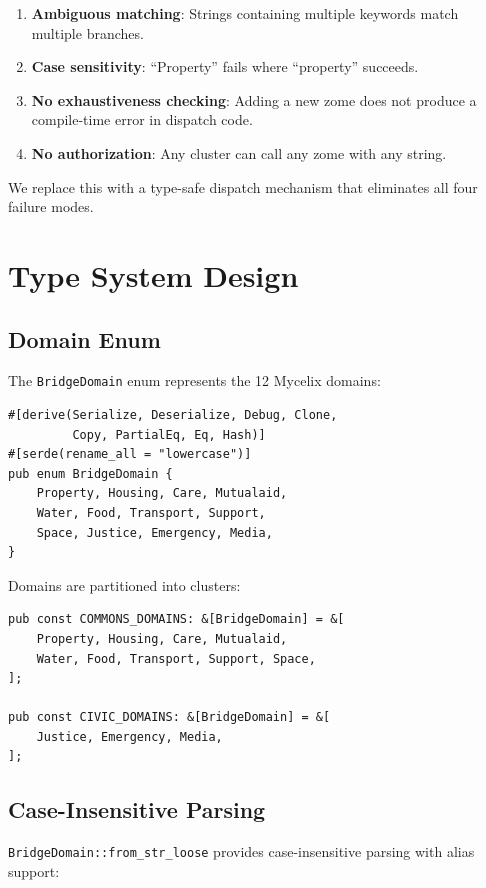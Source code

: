 \documentclass[11pt,twocolumn]{article}
\begin{document}
\begin{enumerate}[nosep]
  \item \textbf{Ambiguous matching}: Strings containing multiple keywords
    match multiple branches.
  \item \textbf{Case sensitivity}: ``Property'' fails where ``property'' succeeds.
  \item \textbf{No exhaustiveness checking}: Adding a new zome does not produce
    a compile-time error in dispatch code.
  \item \textbf{No authorization}: Any cluster can call any zome with any string.
\end{enumerate}

We replace this with a type-safe dispatch mechanism that eliminates all four
failure modes.

\section{Type System Design}

\subsection{Domain Enum}

The \texttt{BridgeDomain} enum represents the 12 Mycelix domains:

\begin{lstlisting}
#[derive(Serialize, Deserialize, Debug, Clone,
         Copy, PartialEq, Eq, Hash)]
#[serde(rename_all = "lowercase")]
pub enum BridgeDomain {
    Property, Housing, Care, Mutualaid,
    Water, Food, Transport, Support,
    Space, Justice, Emergency, Media,
}
\end{lstlisting}

Domains are partitioned into clusters:

\begin{lstlisting}
pub const COMMONS_DOMAINS: &[BridgeDomain] = &[
    Property, Housing, Care, Mutualaid,
    Water, Food, Transport, Support, Space,
];

pub const CIVIC_DOMAINS: &[BridgeDomain] = &[
    Justice, Emergency, Media,
];
\end{lstlisting}

\subsection{Case-Insensitive Parsing}

\texttt{BridgeDomain::from\_str\_loose} provides case-insensitive parsing
with alias support:
\end{document}
